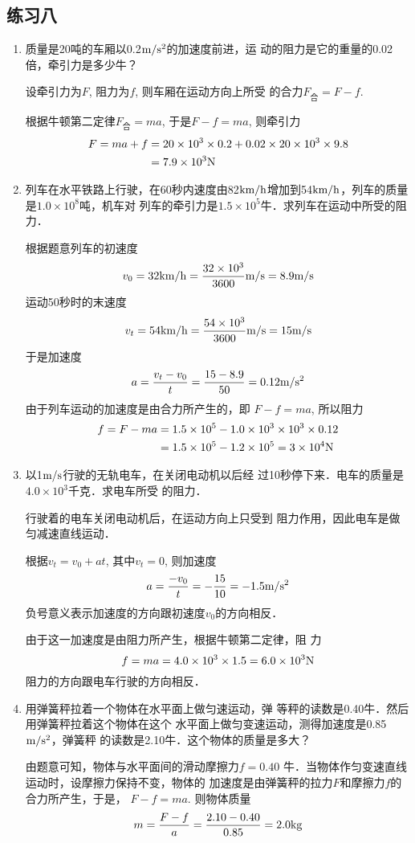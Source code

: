 \subsection{练习八}
\begin{enumerate}
\item 质量是20吨的车厢以0.2$\text{m}/\text{s}^2$的加速度前进，运
动的阻力是它的重量的0.02倍，牵引力是多少牛？
	 
\begin{solution}
    设牵引力为$F$, 阻力为$f$, 则车厢在运动方向上所受
    的合力$F_{\text{合}}=F-f$.

    根据牛顿第二定律$F_{\text{合}}=ma$, 于是$F-f=ma$, 则牵引力
\[\begin{split}
    F=ma+f &=20\times10^3\times0.2+0.02\times20\times10^3\times9.8\\
    &=7.9\times10^3{\rm N}
\end{split}\]
\end{solution}
\item  列车在水平铁路上行驶，在60秒内速度由82$\text{km}/\text{h}$增加到54$\text{km}/\text{h}$，列车的质量是$1.0\times 10^8$吨，机车对
列车的牵引力是$1.5\times 10^5$牛．求列车在运动中所受的阻力．
	 
\begin{solution}
    根据题意列车的初速度
    $$v_0=32\text{km}/\text{h}=\dfrac{32\times 10^3}{3600}\text{m}/\text{s}=8.9\text{m}/\text{s}$$
    运动50秒时的末速度 
\[v_t=54\text{km}/\text{h}=\frac{54\times 10^3}{3600}\text{m}/\text{s}=15\text{m}/\text{s}\]
于是加速度
\[a=\frac{v_t-v_0}{t}=\frac{15-8.9}{50}=0.12\text{m}/\text{s}^2\]
由于列车运动的加速度是由合力所产生的，即
$F-f=ma$, 所以阻力
\[\begin{split}
    f=F-ma&=1.5\times10^5-1.0\times10^3\times10^3\times0.12\\
&=    1.5\times 10^5-1.2\times10^5=3\times10^4{\rm N}
\end{split}\]
\end{solution}
\item  以1$\text{m}/\text{s}$行驶的无轨电车，在关闭电动机以后经
过10秒停下来．电车的质量是$4.0\times 10^3$千克．求电车所受
的阻力．
	 
\begin{solution}
    行驶着的电车关闭电动机后，在运动方向上只受到
阻力作用，因此电车是做匀减速直线运动．

根据$v_t=v_0+at$, 其中$v_t=0$, 则加速度
\[a=\frac{-v_0}{t}=-\frac{15}{10}=-1.5\text{m}/\text{s}^2\]
负号意义表示加速度的方向跟初速度$v_0$的方向相反．

由于这一加速度是由阻力所产生，根据牛顿第二定律，阻
力
\[f=ma=4.0\times10^3\times1.5=6.0\times10^3{\rm N}\]
阻力的方向跟电车行驶的方向相反．
\end{solution}
\item  用弹簧秤拉着一个物体在水平面上做匀速运动，弹
等秤的读数是0.40牛．然后用弹簧秤拉着这个物体在这个
水平面上做匀变速运动，测得加速度是0.85$\text{m}/\text{s}^2$，弹簧秤
的读数是2.10牛．这个物体的质量是多大？
	 
\begin{solution}
    由题意可知，物体与水平面间的滑动摩擦力$f=0.40$
牛．当物体作匀变速直线运动时，设摩擦力保持不变，物体的
加速度是由弹簧秤的拉力$F$和摩擦力$f$的合力所产生，于是，
$F-f=ma$. 则物体质量
\[m=\frac{F-f}{a}=\frac{2.10-0.40}{0.85}=2.0{\rm kg}\]
\end{solution}
\end{enumerate}



